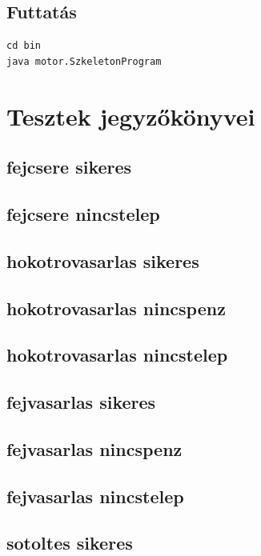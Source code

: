 \subsection{Futtatás}
\begin{verbatim}
cd bin
java motor.SzkeletonProgram
\end{verbatim}

\section{Tesztek jegyzőkönyvei}

\subsection{fejcsere sikeres}
\subsection{fejcsere nincstelep}
\subsection{hokotrovasarlas sikeres}
\subsection{hokotrovasarlas nincspenz}
\subsection{hokotrovasarlas nincstelep}
\subsection{fejvasarlas sikeres}
\subsection{fejvasarlas nincspenz}
\subsection{fejvasarlas nincstelep}
\subsection{sotoltes sikeres}
